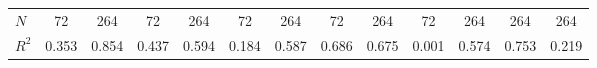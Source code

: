 \begin{table}[htbp]
\begin{tabular}{l*{12}{c}}
\hline
\(N\)       &          72         &         264         &          72         &         264         &          72         &         264         &          72         &         264         &          72         &         264         &         264         &         264         \\
\(R^{2}\)   &       0.353         &       0.854         &       0.437         &       0.594         &       0.184         &       0.587         &       0.686         &       0.675         &       0.001         &       0.574         &       0.753         &       0.219         \\
\hline\hline
\end{tabular}
\end{table}
